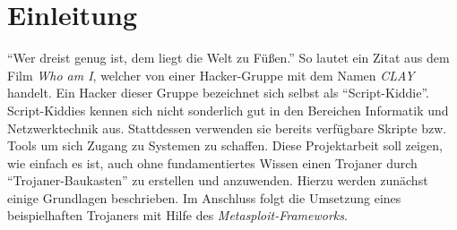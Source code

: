 \section{Einleitung}\label{sec:einleitung}
\enquote{Wer dreist genug ist, dem liegt die Welt zu Füßen.}
So lautet ein Zitat aus dem Film \textit{Who am I}, 
welcher von einer Hacker-Gruppe mit dem Namen \textit{CLAY} handelt. 
Ein Hacker dieser Gruppe bezeichnet sich selbst als \enquote{Script-Kiddie}.
Script-Kiddies kennen sich nicht sonderlich gut in den Bereichen Informatik und Netzwerktechnik aus.
Stattdessen verwenden sie bereits verfügbare Skripte bzw. Tools um sich Zugang zu Systemen zu schaffen. 
Diese Projektarbeit soll zeigen, wie einfach es ist,
auch ohne fundamentiertes Wissen einen Trojaner durch \enquote{Trojaner-Baukasten} zu erstellen und anzuwenden. 
Hierzu werden zunächst einige Grundlagen beschrieben.
Im Anschluss folgt die Umsetzung eines beispielhaften Trojaners mit Hilfe des \textit{Metasploit-Frameworks}.